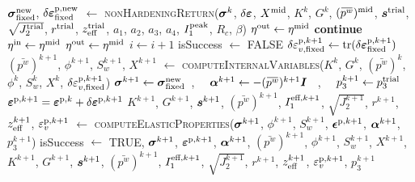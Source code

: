 \begin{breakablealgorithm}
\begin{algorithmic}[1]
          \EndIf
        \EndWhile
        \State $\boldsymbol{\sigma}_{\text{fixed}}^{\text{new}}$, $\delta\boldsymbol{\varepsilon}^{\text{p},\text{new}}_{\text{fixed}}$ $\leftarrow$
          \textsc{nonHardeningReturn}($\boldsymbol{\sigma}^k$, $\delta\boldsymbol{\varepsilon}$, $X^{\text{mid}}$, $K^k$, $G^k$, 
             $(\bar{p^w})^\Tmid$, \WRP
             $\boldsymbol{s}^{\text{trial}}$, $\sqrt{J_2^{\text{trial}}}$, $r^{\text{trial}}$, $z_{\text{eff}}^{\text{trial}}$, 
             $a_1$, $a_2$, $a_3$, $a_4$, $I_1^{\text{peak}}$, $R_c$, $\beta$) \WRP 
          \State $\eta^{\text{out}} \leftarrow \eta^{\text{mid}}$ 
          \State \textbf{continue}
        \EndIf
        \If {$\Norm{\delta\Bveps^{\Tp,\Tnew}_\Tfix}{} > \eta^\Tmid \Norm{\delta\Bveps^{\Tp}_\Tfix}{}$}
          \State $\eta^{\text{in}} \leftarrow \eta^{\text{mid}}$ 
        \Else
          \State $\eta^{\text{out}} \leftarrow \eta^{\text{mid}}$ 
        \EndIf
        \State $i \leftarrow i+1$
          \State \Return isSuccess $\leftarrow$ FALSE
        \EndIf
      \EndWhile 
      \State $\delta\varepsilon^{\text{p},k+1}_{v,\text{fixed}} \leftarrow \text{tr}(\delta\boldsymbol{\varepsilon}^{\text{p},k+1}_{\text{fixed}})$
      \State $(\bar{p^w})^{k+1}$, $\phi^{k+1}$, $S_w^{k+1}$, $X^{k+1}$ $\leftarrow$
        \textsc{computeInternalVariables}($K^k$, $G^k$, $(\bar{p^w})^k$, $\phi^k$, $S_w^k$,\WRP 
          $X^k$, $\delta\varepsilon^{\text{p},{k+1}}_{v,\text{fixed}}$)
      \State $\boldsymbol{\sigma}^{k+1} \leftarrow \boldsymbol{\sigma}^{\text{new}}_{\text{fixed}}$~,~~
             $\Balpha^{k+1} \leftarrow -(\bar{p^w})^{k+1} \BI$ ~,~~ $p_3^{k+1} \leftarrow p_3^{\text{trial}}$
      \State $\boldsymbol{\varepsilon}^{\text{p},{k+1}} = \boldsymbol{\varepsilon}^{\text{p},k} + \delta\boldsymbol{\varepsilon}^{\text{p},{k+1}}$
      \State $K^{k+1}$, $G^{k+1}$, $\boldsymbol{s}^{k+1}$, $(\bar{p^w})^{k+1}$, $I_1^{\text{eff},{k+1}}$, 
             $\sqrt{J_2^{k+1}}$, $r^{k+1}$, $z_{\text{eff}}^{k+1}$, $\varepsilon_v^{\text{p},{k+1}}$ $\leftarrow$ \WRP
          \textsc{computeElasticProperties}($\boldsymbol{\sigma}^{k+1}$, 
             $\phi^{k+1}$, $S_w^{k+1}$, $\boldsymbol{\epsilon}^{\text{p},{k+1}}$, $\boldsymbol{\alpha}^{k+1}$, $p_3^{k+1}$) \WRP
      \State \Return isSuccess $\leftarrow$ TRUE, $\boldsymbol{\sigma}^{k+1}$, $\boldsymbol{\varepsilon}^{\text{p},{k+1}}$, $\boldsymbol{\alpha}^{k+1}$,
        $(\bar{p^w})^{k+1}$, $\phi^{k+1}$, $S_w^{k+1}$, $X^{k+1}$, $K^{k+1}$, $G^{k+1}$, \WRP
        $\boldsymbol{s}^{k+1}$, $(\bar{p^w})^{k+1}$, $I_1^{\text{eff},{k+1}}$, $\sqrt{J_2^{k+1}}$, $r^{k+1}$, 
        $z_{\text{eff}}^{k+1}$, $\varepsilon_v^{\text{p},{k+1}}$, $p_3^{k+1}$
    \EndProcedure
  \end{algorithmic}
\end{breakablealgorithm}

